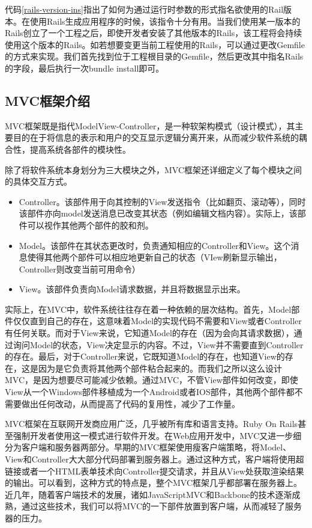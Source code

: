 代码\ref{rails-version-ins}指出了如何为通过运行时参数的形式指名欲使用的Rail版本。在使用Rails生成应用程序的时候，该指令十分有用。当我们使用某一版本的Rails创立了一个工程之后，即使开发者安装了其他版本的Rails，该工程将会持续使用这个版本的Rails。如若想要变更当前工程使用的Rails，可以通过更改Gemfile的方式来实现。我们首先找到位于工程根目录的Gemfile，然后更改其中指名Rails的字段，最后执行一次bundle install即可。

\subsection{MVC框架介绍}
MVC框架既是指代ModelView-Controller，是一种软架构模式（设计模式），其主要目的在于将信息的表示和用户的交互显示逻辑分离开来，从而减少软件系统的耦合性，提高系统各部件的模块性\supercite{mvc-01}\supercite{mvc-02}。

除了将软件系统本身划分为三大模块之外，MVC框架还详细定义了每个模块之间的具体交互方式\supercite{mvc-03}。

\begin{itemize}
\item Controller。该部件用于向其控制的View发送指令（比如翻页、滚动等），同时该部件亦向model发送消息已改变其状态（例如编辑文档内容）。实际上，该部件可以视作其他两个部件的胶和剂。

\item Model。该部件在其状态更改时，负责通知相应的Controller和View。这个消息使得其他两个部件可以相应地更新自己的状态（VIew刷新显示输出，Controller则改变当前可用命令）

\item View。该部件负责向Model请求数据，并且将数据显示出来。
\end{itemize}

实际上，在MVC中，软件系统往往存在着一种依赖的层次结构。首先，Model部件仅仅直到自己的存在，这意味着Model的实现代码不需要和View或者Controller有任何关联。而对于View来说，它知道Model的存在（因为会向其请求数据），通过询问Model的状态，View决定显示的内容。不过，View并不需要直到Controller的存在。最后，对于Controller来说，它既知道Model的存在，也知道View的存在，这是因为是它负责将其他两个部件粘合起来的。而我们之所以这么设计MVC，是因为想要尽可能减少依赖。通过MVC，不管View部件如何改变，即使View从一个Windows部件移植成为一个Android或者IOS部件，其他两个部件都不需要做出任何改动，从而提高了代码的复用性，减少了工作量。

MVC框架在互联网开发商应用广泛，几乎被所有库和语言支持。Ruby On Rails甚至强制开发者使用这一模式进行软件开发。在Web应用开发中，MVC又进一步细分为客户端和服务器两部分。早期的MVC框架使用瘦客户端策略，将Model、View和Controller大大部分代码部署到服务器上。通过这种方式，客户端将使用超链接或者一个HTML表单技术向Controller提交请求，并且从View处获取渲染结果的输出。可以看到，这种方式的特点是，整个MVC框架几乎都部署在服务器上\supercite{mvc-04}。近几年，随着客户端技术的发展，诸如JavaScriptMVC和Backbone的技术逐渐成熟，通过这些技术，我们可以将MVC的一下部件放置到客户端，从而减轻了服务器的压力。

